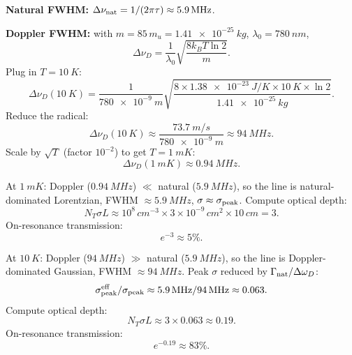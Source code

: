 \documentclass[11pt]{article}
\begin{document}
\textbf{Natural FWHM:} $\Delta\nu_{\rm nat}=1/(2\pi\tau)\approx \SI{5.9}{MHz}$.

\textbf{Doppler FWHM:} with $m=85\,m_u=\SI{1.41e-25}{kg}$, $\lambda_0=\SI{780}{nm}$,
\[
\Delta\nu_D = \frac{1}{\lambda_0}\sqrt{\frac{8 k_B T \ln 2}{m}}.
\]
Plug in $T=\SI{10}{K}$:
\[
\Delta\nu_D(\SI{10}{K}) = \frac{1}{\SI{780e-9}{m}}\sqrt{\frac{8\times\SI{1.38e-23}{J/K}\times \SI{10}{K}\times \ln 2}{\SI{1.41e-25}{kg}}}.
\]
Reduce the radical:
\[
\Delta\nu_D(\SI{10}{K}) \approx \frac{\SI{73.7}{m/s}}{\SI{780e-9}{m}} \approx \SI{94}{MHz}.
\]
Scale by $\sqrt{T}$ (factor $10^{-2}$) to get $T=\SI{1}{mK}$:
\[
\Delta\nu_D(\SI{1}{mK})\approx \SI{0.94}{MHz}.
\]

At $\SI{1}{mK}$: Doppler ($\SI{0.94}{MHz}$) $\ll$ natural ($\SI{5.9}{MHz}$), so the line is natural-dominated Lorentzian, FWHM $\approx \SI{5.9}{MHz}$, $\sigma\approx\sigma_{\rm peak}$. Compute optical depth:
\[
N_T\sigma L \approx 10^{8}\,\si{cm^{-3}}\times 3\times 10^{-9}\,\si{cm^{2}}\times 10\,\si{cm} = 3.
\]
On-resonance transmission:
\[
e^{-3}\approx 5\%.
\]

At $\SI{10}{K}$: Doppler ($\SI{94}{MHz}$) $\gg$ natural ($\SI{5.9}{MHz}$), so the line is Doppler-dominated Gaussian, FWHM $\approx \SI{94}{MHz}$. Peak $\sigma$ reduced by $\Gamma_{\rm nat}/\Delta\omega_D$:
\[
\sigma_{\rm peak}^{\rm eff}/\sigma_{\rm peak} \approx \SI{5.9}{MHz}/\SI{94}{MHz} \approx 0.063.
\]
Compute optical depth:
\[
N_T\sigma L \approx 3\times 0.063 \approx 0.19.
\]
On-resonance transmission:
\[
e^{-0.19}\approx 83\%.
\]

\begin{center}
\end{center}
\end{document}
